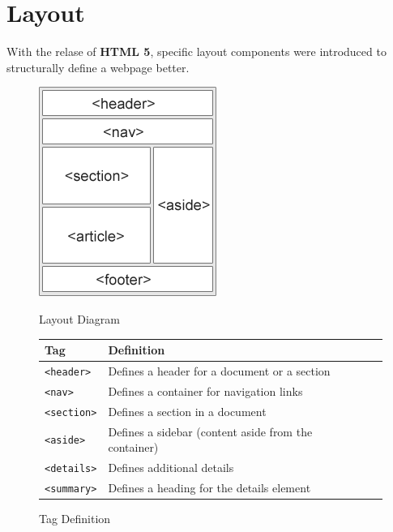 \documentclass[11pt, letterpaper]{article}
\begin{document}
	\section{Layout}
		With the relase of \textbf{HTML 5}, specific layout components were introduced to structurally define a webpage better.
		\begin{figure}[!h]
			\CenterFloatBoxes
			\begin{floatrow}
				\ffigbox
					{\includegraphics{layout}}
					{\caption{Layout Diagram}}
				\killfloatstyle
				\ttabbox
					{\begin{tabular}{l p{5cm} l}
						\toprule
						Tag & Definition \\\midrule
						\texttt{<header>} & Defines a header for a document or a section \\\midrule
						\texttt{<nav>} & Defines a container for navigation links \\\midrule
						\texttt{<section>} & Defines a section in a document \\\midrule
						\texttt{<aside>} & Defines a sidebar (content aside from the container) \\\midrule
						\texttt{<details>} & Defines additional details \\\midrule
						\texttt{<summary>} & Defines a heading for the details element \\
						\bottomrule
					\end{tabular}}
					{\caption{Tag Definition}}
			\end{floatrow}
		\end{figure}
\end{document}
